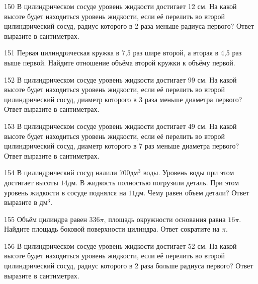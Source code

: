 \documentclass[4apaper]{article}
\begin{document}
\begin{taskBN}{150}
В цилиндрическом сосуде уровень жидкости достигает 12 см. На какой высоте будет находиться уровень жидкости, если её перелить во второй цилиндрический сосуд, радиус которого в 2 раза меньше радиуса первого? Ответ выразите в сантиметрах.
\end{taskBN}

\begin{taskBN}{151}
 Первая цилиндрическая кружка в 7,5 раз шире второй, а вторая в 4,5 раз выше первой. Найдите отношение объёма второй кружки к объёму первой.
\end{taskBN}

\begin{taskBN}{152}
В цилиндрическом сосуде уровень жидкости достигает 99 см. На какой высоте будет находиться уровень жидкости, если её перелить во второй цилиндрический сосуд, диаметр которого в 3 раза меньше диаметра первого? Ответ выразите в сантиметрах.
\end{taskBN}

\begin{taskBN}{153}
В цилиндрическом сосуде уровень жидкости достигает 49 см. На какой высоте будет находиться уровень жидкости, если её перелить во второй цилиндрический сосуд, диаметр которого в 7 раз меньше диаметра первого? Ответ выразите в сантиметрах.
\end{taskBN}

\begin{taskBN}{154}
В цилиндрический сосуд налили $700\mbox{дм}^3$ воды. Уровень воды при этом достигает высоты $14$дм. В жидкость полностью погрузили деталь. При этом уровень жидкости в сосуде поднялся на $11$дм. Чему равен объем детали? Ответ выразите в $\mbox{дм}^3$.
\end{taskBN}

\begin{taskBN}{155}
Объём цилиндра равен $336\pi$, площадь окружности основания равна $16\pi$. Найдите площадь боковой поверхности цилиндра. Ответ сократите на $\pi$.
\end{taskBN}

\begin{taskBN}{156}
В цилиндрическом сосуде уровень жидкости достигает 52 см. На какой высоте будет находиться уровень жидкости, если её перелить во второй цилиндрический сосуд, радиус которого в 2 раза больше радиуса первого? Ответ выразите в сантиметрах.
\end{taskBN}
\end{document}

